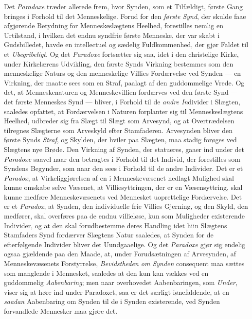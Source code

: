 Det \emph{Paradoxe} træder allerede frem, hvor Synden, som et Tilfældigt, første
Gang bringes i Forhold til det Menneskelige. Forud for den \emph{første Synd},
der skulde faae afgjørende Betydning for Menneskeslægtens Heelhed, forestilles
nemlig en Urtilstand, i hvilken det endnu syndfrie første Menneske, der var
skabt i Gudsbilledet, havde en intellectuel og sædelig Fuldkommenhed, der gjør
Faldet til et \emph{Ubegribeligt}. Og det \emph{Paradoxe} fortsætter sig saa,
idet i den christelige Kirke, under Kirkelærens Udvikling, den
 første Synds Virkning bestemmes som den menneskelige Naturs og den menneskelige
Villies Fordærvelse ved Synden --- en Virkning, der maatte sees som en Straf,
paalagt af den guddommelige Vrede. Og det, at Menneskenaturen og
Menneskevillien fordærves ved den første Synd --- det første Menneskes Synd ---
bliver, i Forhold til de \emph{andre In}divider i Slægten, saaledes opfattet, at
Fordærvelsen i Naturen forplanter sig til Menneskeslægtens Heelhed, udbreder sig
fra Slægt til Slægt som Arvesynd, og at Overtrædelsen tilregnes Slægterne som
Arveskyld efter Stamfaderen. Arvesynden bliver den første Synds \emph{Straf}, og
Skylden, der hviler paa Slægten, maa stadig forøges ved Slægtens nye Brøde. Den
Virkning af Synden, der statueres, gaaer ind under det \emph{Paradoxe} saavel
naar den betragtes i Forhold til det Individ, der forestilles som Syndens
Begynder, som naar den sees i Forhold til de andre Individer. Det er et
\emph{Paradox}, at Virkeliggjørelsen af en i Menneskevæsenet nedlagt Mulighed
skal kunne omskabe selve Væsenet, at Villiesyttringen, der er en Væsensyttring,
skal kunne medføre Menneskevæsenets ved Mennesket uoprettelige Fordærvelse. Det
er et \emph{Paradox}, at Synden, den individuelle frie Villies Gjerning, og den
Skyld, den medfører, skal overføres paa de endnu villieløse, kun som Muligheder
existerende Individer, og at den skal forudbestemme deres Handling idet hiin
Slægtens Stamfaders Synd fordærver Slægtens Natur saaledes, at Synden for de
efterfølgende Individer bliver det Uundgaaelige. Og det \emph{Paradoxe} gjør sig
endelig ogsaa gjældende paa den Maade, at, under Forudsætningen af Arvesynden,
af Menneskevæsenets Forstyrrelse, \emph{Bevidstheden om Synden} consequent maa
sættes som manglende i Mennesket, saaledes at den kun kan vækkes ved en
guddommelig \emph{Aabenbaring}; men naar overhovedet Aabenbaringen, som
\emph{Under}, viser sig at høre ind under Paradoxet, saa er det særligt
iønefaldende, at en \emph{saadan} Aabenbaring om Synden til de i Synden
existerende, ved Synden forvandlede Mennesker maa gjøre det.

